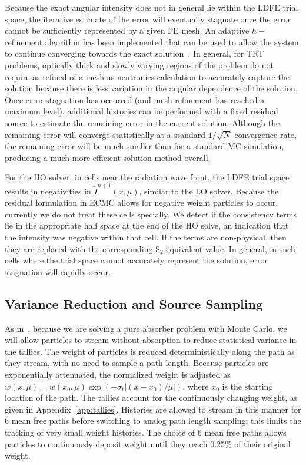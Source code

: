 \documentclass[12pt]{article}
\begin{document}
\begin{center}
Because the exact angular intensity does not in general lie within the LDFE trial space, the
iterative estimate of the error will eventually stagnate once the error cannot be sufficiently
represented by a given FE mesh.  An adaptive $h-$refinement algorithm has been
implemented that can be used to allow the system to continue converging towards the
exact solution~\cite{jake,ans_2014}. In general, for TRT problems, optically thick and slowly varying
regions of the problem do not require as refined of a mesh as neutronics calculation to accurately capture the
solution because there is less variation in the angular dependence of the solution.
Once error stagnation has occurred (and mesh refinement has reached a maximum level),
additional histories can be performed with a
fixed residual source to estimate the remaining error in the current solution.  Although the remaining error will
converge statistically at a standard $1/\sqrt{N}$ convergence rate, the remaining
error will be much smaller than for a standard MC simulation, producing a much more
efficient solution method overall.

For the HO solver, in cells near the radiation wave front, the LDFE trial space results in negativities in
$\tilde{I}^{n+1}(x,\mu)$, similar to the LO solver.  Because the residual formulation in ECMC allows for negative weight
particles to occur, currently we do not treat these cells specially.  We detect if
the consistency terms lie in the appropriate half space at the end of the HO solve,
an indication that the intensity was negative within that cell.  If the terms are non-physical, then
they are replaced with the corresponding S$_2$-equivalent value. In general,
in such cells where the trial space cannot accurately represent the solution, error stagnation will
rapidly occur. 

\subsection{Variance Reduction and Source Sampling}


As in~\cite{park}, because we are solving a pure absorber problem with Monte Carlo, we will allow
particles to stream without absorption to reduce statistical 
variance in the tallies.  The weight of particles is reduced deterministically along
the path as they stream, with no need to sample a path length.  Because particles are exponentially attenuated, the normalized weight is
adjusted as $w(x,\mu) = w(x_0,\mu)\exp(-\sigma_t|(x-x_0)/\mu|)$, where $x_0$ is the starting location of the path.  The tallies account
for the continuously changing weight, as given in Appendix~\ref{app:tallies}. Histories are allowed to stream in this manner for 6 mean free paths
before switching to analog path length sampling; this limits the tracking of very small weight histories. The choice of 6 mean free paths allows particles to 
continuously deposit weight until they reach 0.25\% of their original weight.


\end{center}
\end{document}
